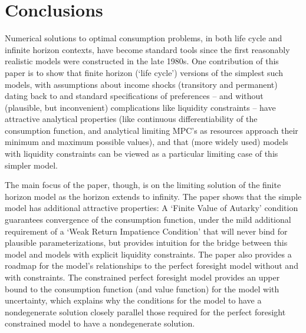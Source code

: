 \documentclass[BufferStockTheory]{subfiles}
\begin{document}

\hypertarget{Conclusions}{}
\section{Conclusions}

Numerical solutions to optimal consumption problems, in both life cycle and infinite horizon contexts, have become standard tools since the first reasonably realistic models were constructed in the late 1980s. One contribution of this paper is to show that finite horizon (`life cycle') versions of the simplest such models, with assumptions about income shocks (transitory and permanent) dating back to \cite{friedmanATheory} and standard specifications of preferences -- and without (plausible, but inconvenient) complications like liquidity constraints -- have attractive analytical properties (like continuous differentiability of the consumption function, and analytical limiting MPC's as resources approach their minimum and maximum possible values), and that (more widely used) models with liquidity constraints can be viewed as a particular limiting case of this simpler model.

The main focus of the paper, though, is on the limiting solution of the finite horizon model as the horizon extends to infinity.  The paper shows that the simple model has additional attractive properties: A \href{https://econ-ark.github.io/BufferStockTheory#FVAC}{}`Finite Value of Autarky' condition guarantees convergence of the consumption function, under the mild additional requirement of a `Weak Return Impatience Condition' that will never bind for plausible parameterizations, but provides intuition for the bridge between this model and models with explicit liquidity constraints. The paper also provides a roadmap for the model's relationships to the perfect foresight model without and with constraints.  The constrained perfect foresight model provides an upper bound to the consumption function (and value function) for the model with uncertainty, which explains why the conditions for the model to have a nondegenerate solution closely parallel those required for the perfect foresight constrained model to have a nondegenerate solution.
\end{document}
